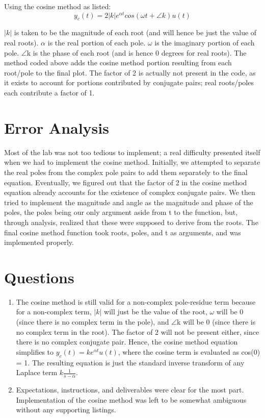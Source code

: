 \documentclass[11pt,a4,titlepage]{article}
\begin{document}
Using the cosine method as listed:
\[y_{c}(t) = 2|k|e^{\alpha t}cos(\omega t + \angle k)u(t)\]

$|k|$ is taken to be the magnitude of each root (and will hence be just the value of real roots). $\alpha$ is the real portion of each pole. $\omega$ is the imaginary portion of each pole. $\angle$k is the phase of each root (and is hence 0 degrees for real roots). The method coded above adds the cosine method portion resulting from each root/pole to the final plot. The factor of 2 is actually not present in the code, as it exists to account for portions contributed by conjugate pairs; real roots/poles each contribute a factor of 1.

\section{Error Analysis}
Most of the lab was not too tedious to implement; a real difficulty presented itself when we had to implement the cosine method. Initially, we attempted to separate the real poles from the complex pole pairs to add them separately to the final equation. Eventually, we figured out that the factor of 2 in the cosine method equation already accounts for the existence of complex conjugate pairs. We then tried to implement the magnitude and angle as the magnitude and phase of the poles, the poles being our only argument aside from t to the function, but, through analysis, realized that these were supposed to derive from the roots. The final cosine method function took roots, poles, and t as arguments, and was implemented properly.

\section{Questions}
\begin{enumerate}
	\item The cosine method is still valid for a non-complex pole-residue term because for a non-complex term, $|k|$ will just be the value of the root, $\omega$ will be 0 (since there is no complex term in the pole), and $\angle$k will be 0 (since there is no complex term in the root). The factor of 2 will not be present either, since there is no complex conjugate pair. Hence, the cosine method equation simplifies to $y_{c}(t) = ke^{\alpha t}u(t)$, where the cosine term is evaluated as cos(0) = 1. The resulting equation is just the standard inverse transform of any Laplace term $k\frac{1}{s - \alpha}$.
	\item Expectations, instructions, and deliverables were clear for the most part. Implementation of the cosine method was left to be somewhat ambiguous without any supporting listings.
\end{enumerate}
\end{document}
